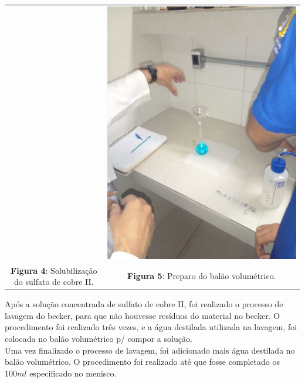 \documentclass[a4paper, 11pt]{article}
\begin{document}
\begin{center}
\begin{tabular}{c c}
                & \parbox{7cm}{\includegraphics[scale=0.2]{04. preparo do balao.jpeg}}
                \\
                \textbf{Figura 4}: Solubilização do sulfato de cobre II\@.
                & \textbf{Figura 5}: Preparo do balão volumétrico\@.
            \end{tabular}
        \end{center}

        \doublespacing

        \indent Após a solução concentrada de sulfato de cobre II, foi realizado o processo de lavagem do becker, para
        que não houvesse resíduos do material no becker\@. O procedimento foi realizado três vezes, e a água destilada
        utilizada na lavagem, foi colocada no balão volumétrico p/ compor a solução\@.\\
        \indent Uma vez finalizado o processo de lavagem, foi adicionado mais água destilada no balão volumétrico\@.
        O procedimento foi realizado até que fosse completado os $100ml$ especificado no menisco\@.\\
\end{document}
